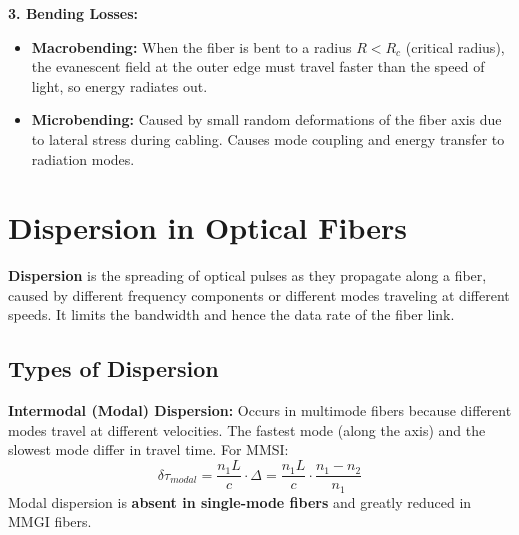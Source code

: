 \documentclass[12pt,a4paper]{article}
\begin{document}
\textbf{3. Bending Losses:}
\begin{itemize}[leftmargin=*, itemsep=2pt]
  \item \textbf{Macrobending:} When the fiber is bent to a radius $R < R_c$ (critical radius), the evanescent field at the outer edge must travel faster than the speed of light, so energy radiates out.
  \item \textbf{Microbending:} Caused by small random deformations of the fiber axis due to lateral stress during cabling. Causes mode coupling and energy transfer to radiation modes.
\end{itemize}

\section{Dispersion in Optical Fibers}

\begin{tcolorbox}[defbox, title={\textbf{Dispersion --- Definition}}]
\textbf{Dispersion} is the spreading of optical pulses as they propagate along a fiber, caused by different frequency components or different modes traveling at different speeds. It limits the bandwidth and hence the data rate of the fiber link.
\end{tcolorbox}

\subsection{Types of Dispersion}

\textbf{Intermodal (Modal) Dispersion:}
Occurs in multimode fibers because different modes travel at different velocities. The fastest mode (along the axis) and the slowest mode differ in travel time. For MMSI:
\[
\delta\tau_{modal} = \frac{n_1 L}{c}\cdot\Delta = \frac{n_1 L}{c}\cdot\frac{n_1 - n_2}{n_1}
\]
Modal dispersion is \textbf{absent in single-mode fibers} and greatly reduced in MMGI fibers.
\end{document}
